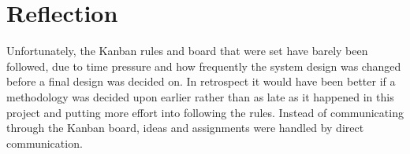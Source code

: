 \section{Reflection}

Unfortunately, the Kanban rules and board that were set have barely been followed, due to time pressure and how frequently the system design was changed before a final design was decided on. In retrospect it would have been better if a methodology was decided upon earlier rather than as late as it happened in this project and putting more effort into following the rules. Instead of communicating through the Kanban board, ideas and assignments were handled by direct communication.